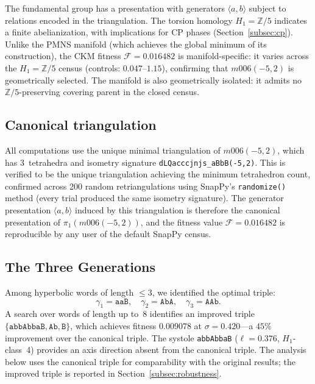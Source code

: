 \documentclass[11pt,a4paper]{article}
\begin{document}
The fundamental group has a presentation with generators 
$\langle a, b \rangle$ subject to relations encoded in the triangulation. 
The torsion homology $H_1 = \mathbb{Z}/5$ indicates a finite abelianization,
with implications for CP phases (Section~\ref{subsec:cp}).
Unlike the PMNS manifold (which achieves the global minimum of its
construction), the CKM fitness $\mathcal{F} = 0.016482$ is manifold-specific:
it varies across the $H_1 = \mathbb{Z}/5$ census (controls: $0.047$--$1.15$),
confirming that $m006(-5,2)$ is geometrically selected.
The manifold is also geometrically isolated: it admits no
$\mathbb{Z}/5$-preserving covering parent in the closed census.


\subsection{Canonical triangulation}
\label{subsec:canonical_triang}

All computations use the unique minimal triangulation of $m006(-5,2)$,
which has 3~tetrahedra and isometry signature
\texttt{dLQacccjnjs\_aBbB(-5,2)}.
This is verified to be the unique triangulation achieving the minimum
tetrahedron count, confirmed across 200 random retriangulations using
SnapPy's \texttt{randomize()} method (every trial produced the same
isometry signature). The generator presentation $\langle a, b\rangle$
induced by this triangulation is therefore the canonical presentation
of $\pi_1(m006(-5,2))$, and the fitness value $\mathcal{F} = 0.016482$
is reproducible by any user of the default SnapPy census.

\subsection{The Three Generations}
\label{subsec:generations}

Among hyperbolic words of length $\leq 3$, we identified the optimal 
triple:
\[
\gamma_1 = \texttt{aaB}, \quad
\gamma_2 = \texttt{AbA}, \quad
\gamma_3 = \texttt{AAb}.
\]
A search over words of length up to~8 identifies an improved triple
$\{\texttt{abbAbbaB}, \texttt{Ab}, \texttt{B}\}$, which achieves
fitness $0.009078$ at $\sigma = 0.420$---a $45\%$ improvement over
the canonical triple. The systole \texttt{abbAbbaB} ($\ell=0.376$,
$H_1$-class~4) provides an axis direction absent from the canonical
triple. The analysis below uses the canonical triple for comparability
with the original results; the improved triple is reported in
Section~\ref{subsec:robustness}.
\end{document}
